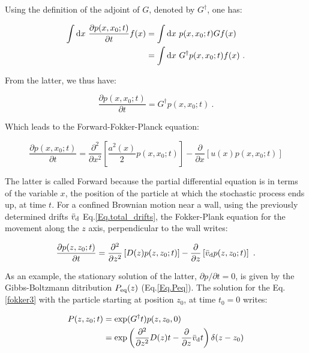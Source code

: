 Using the definition of the adjoint of $G$, denoted by $G ^\dagger$, one has:


\begin{equation}
	\begin{aligned}
	\int \textnormal{d} x ~\frac{\partial p(x, x_0 ; t) }{\partial t} f(x) &= \int \textnormal{d}x ~ p(x, x_0 ; t) G f(x) \\
	&= \int \textnormal{d}x ~  G ^\dagger p(x, x_0 ; t) f(x) ~.
	\end{aligned}
\end{equation}

From the latter, we thus have:

\begin{equation}
	\frac{\partial p(x, x_0 ; t)}{\partial t} = G^\dagger p(x, x_0 ; t) ~.
	\label{fokker3}
\end{equation}

Which leads to the Forward-Fokker-Planck equation:

\begin{equation}
	\frac{\partial p(x, x_0 ; t)}{\partial t }= \frac{\partial ^2}{\partial x^2} \left[\frac{a^2 (x)}{2}p(x, x_0 ; t)\right] - \frac{\partial}{\partial x} \left[u(x) p(x, x_0 ; t)\right]
	\label{Eq.Forward_Fokker_plank}
\end{equation}

The latter is called Forward because the partial differential equation is in terms of the variable $x$, the position of the particle at which the stochastic process ends up, at time $t$. For a confined Brownian motion near a wall, using the previously determined drifts $\bar{v}_\textnormal{d}$ Eq.\ref{Eq.total_drifts}, the Fokker-Plank equation for the movement along the $z$ axis, perpendicular to the wall writes:

\begin{equation}
	\frac{\partial p(z, z_0 ; t)}{\partial t} = \frac{\partial ^2}{\partial z ^2} \left[ D(z)  p(z, z_0 ; t) \right]   -  \frac{\partial }{\partial z} \left[\bar{v}_\textnormal{d} p(z, z_0 ; t)\right] ~.
\end{equation}

As an example, the stationary solution of the latter, $\partial p / \partial t = 0$, is given by the Gibbs-Boltzmann ditribution $P_\textnormal{eq}(z) $ (Eq.\ref{Eq.Peq}). The solution for the Eq.\ref{fokker3} with the particle starting at position $z_0$, at time $t_0 = 0$ writes:

\begin{equation}
	\begin{aligned}
	P(z, z_0; t) &= \exp (G^\dagger t) p(z, z_0, 0) \\
	& = \exp \left( \frac{\partial ^2}{\partial z ^2}  D(z)  t   -  \frac{\partial }{\partial z} \bar{v}_\textnormal{d} t\right) \delta (z - z_0)
	\end{aligned}
\end{equation} 

